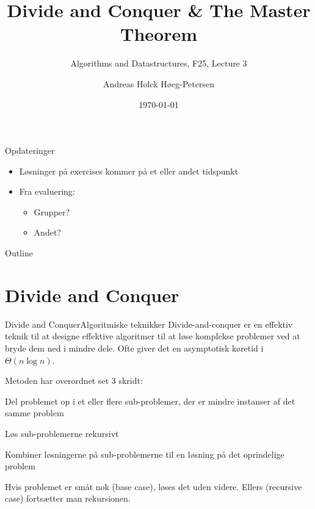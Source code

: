 \documentclass[aspectratio=1610]{beamer}
\title[ALG25 - Lecture 3]
{Divide and Conquer \& The Master Theorem}
\subtitle
{Algorithms and Datastructures, F25, Lecture 3}
\author[Andreas H. Høeg-Petersen]
{Andreas Holck Høeg-Petersen}
\institute[AAU]{%
  Department of Computer Science\\
  Aalborg University
}
\date {\today}
\begin{document}
\begin{frame}
  \titlepage
\end{frame}

\begin{frame}{Opdateringer}{}
    \begin{itemize}
        \item Løsninger på exercises kommer på et eller andet tidspunkt
        \item Fra evaluering:
            \begin{itemize}
                \item Grupper?
                \item Andet?
            \end{itemize}
    \end{itemize}
\end{frame}


\begin{frame}{Outline}
  \tableofcontents
\end{frame}


\section{Divide and Conquer}

\begin{frame}{Divide and Conquer}{Algoritmiske teknikker}
    Divide-and-conquer er en effektiv teknik til at designe effektive
    algoritmer til at løse komplekse problemer ved at bryde dem ned i mindre
    dele. Ofte giver det en asymptotisk køretid i $\Theta(n \log n)$.

    \pause \medskip
    Metoden har overordnet set 3 skridt:

    \pause
    \begin{description}[<+->][Combine]
        \item[Divide] Del problemet op i et eller flere sub-problemer, der er
            mindre instanser af det samme problem
        \item[Conquer] Løs sub-problemerne rekursivt
        \item[Combine] Kombiner løsningerne på sub-problemerne til en løsning på
            det oprindelige problem
    \end{description}

    \pause
    Hvis problemet er småt nok (\alert{base case}), løses det uden videre.
    Ellers (\alert{recursive case}) fortsætter man rekursionen.
\end{frame}
\end{document}

